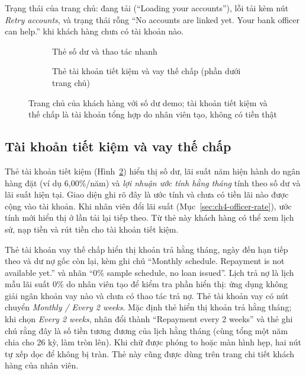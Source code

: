Trạng thái của trang chủ: đang tải (``Loading your accounts''), lỗi tải kèm nút \textit{Retry accounts}, và trạng thái rỗng ``No accounts are linked yet. Your bank officer can help.'' khi khách hàng chưa có tài khoản nào.

\begin{figure}[H]
\centering
\begin{subfigure}[t]{0.4\textwidth}
  \centering
  \caption{Thẻ số dư và thao tác nhanh}
  \label{fig:ch4-home-main}
\end{subfigure}\hspace{0.05\textwidth}%
\begin{subfigure}[t]{0.4\textwidth}
  \centering
  \caption{Thẻ tài khoản tiết kiệm và vay thế chấp (phần dưới trang chủ)}
  \label{fig:ch4-home-accounts}
\end{subfigure}
\caption{Trang chủ của khách hàng với số dư demo; tài khoản tiết kiệm và thế chấp là tài khoản tổng hợp do nhân viên tạo, không có tiền thật}
\label{fig:ch4-home}
\end{figure}

\subsection{Tài khoản tiết kiệm và vay thế chấp}
\label{sec:ch4-saving-mortgage}

Thẻ tài khoản tiết kiệm (Hình~\ref{fig:ch4-home-accounts}) hiển thị số dư, lãi suất năm hiện hành do ngân hàng đặt (ví dụ 6,00\%/năm) và \emph{lợi nhuận ước tính hằng tháng} tính theo số dư và lãi suất hiện tại. Giao diện ghi rõ đây là ước tính và chưa có tiền lãi nào được cộng vào tài khoản. Khi nhân viên đổi lãi suất (Mục~\ref{sec:ch4-officer-rate}), ước tính mới hiển thị ở lần tải lại tiếp theo. Từ thẻ này khách hàng có thể xem lịch sử, nạp tiền và rút tiền cho tài khoản tiết kiệm.

Thẻ tài khoản vay thế chấp hiển thị khoản trả hằng tháng, ngày đến hạn tiếp theo và dư nợ gốc còn lại, kèm ghi chú ``Monthly schedule. Repayment is not available yet.'' và nhãn ``0\% sample schedule, no loan issued''. Lịch trả nợ là lịch mẫu lãi suất 0\% do nhân viên tạo để kiểm tra phần hiển thị: ứng dụng không giải ngân khoản vay nào và chưa có thao tác trả nợ.
Thẻ tài khoản vay có nút chuyển \emph{Monthly / Every 2 weeks}. Mặc định thẻ hiển thị khoản trả hằng tháng; khi chọn \emph{Every 2 weeks}, nhãn đổi thành ``Repayment every 2 weeks'' và thẻ ghi chú rằng đây là số tiền tương đương của lịch hằng tháng (cùng tổng một năm chia cho 26 kỳ, làm tròn lên). Khi chữ được phóng to hoặc màn hình hẹp, hai nút tự xếp dọc để không bị tràn. Thẻ này cũng được dùng trên trang chi tiết khách hàng của nhân viên.

